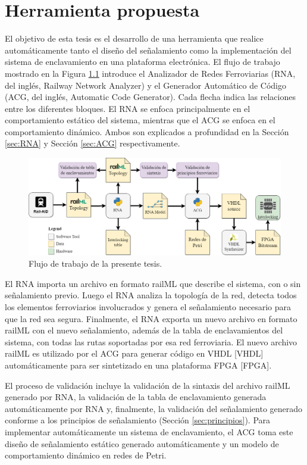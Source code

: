 \chapter{Herramienta propuesta}

    El objetivo de esta tesis es el desarrollo de una herramienta que realice automáticamente tanto el diseño del señalamiento como la implementación del sistema de enclavamiento en una plataforma electrónica. El flujo de trabajo mostrado en la Figura \ref{fig:workflow} introduce el Analizador de Redes Ferroviarias (RNA, del inglés, Railway Network Analyzer) y el Generador Automático de Código (ACG, del inglés, Automatic Code Generator). Cada flecha indica las relaciones entre los diferentes bloques. El RNA se enfoca principalmente en el comportamiento estático del sistema, mientras que el ACG se enfoca en el comportamiento dinámico. Ambos son explicados a profundidad en la Sección \ref{sec:RNA} y Sección \ref{sec:ACG} respectivamente.

    \begin{figure}[h]
        \centering
        \includegraphics[width=1\textwidth]{Figuras/workflow.png}
        \centering\caption{Flujo de trabajo de la presente tesis.}
        \label{fig:workflow}
    \end{figure}

    El RNA importa un archivo en formato railML que describe el sistema, con o sin señalamiento previo. Luego el RNA analiza la topología de la red, detecta todos los elementos ferroviarios involucrados y genera el señalamiento necesario para que la red sea segura. Finalmente, el RNA exporta un nuevo archivo en formato railML con el nuevo señalamiento, además de la tabla de enclavamientos del sistema, con todas las rutas soportadas por esa red ferroviaria. El nuevo archivo railML es utilizado por el ACG para generar código en VHDL [VHDL] automáticamente para ser sintetizado en una plataforma FPGA [FPGA].
    
    El proceso de validación incluye la validación de la sintaxis del archivo railML generado por RNA, la validación de la tabla de enclavamiento generada automáticamente por RNA y, finalmente, la validación del señalamiento generado conforme a los principios de señalamiento (Sección \ref{sec:principios}). Para implementar automáticamente un sistema de enclavamiento, el ACG toma este diseño de señalamiento estático generado automáticamente y un modelo de comportamiento dinámico en redes de Petri. %
    





